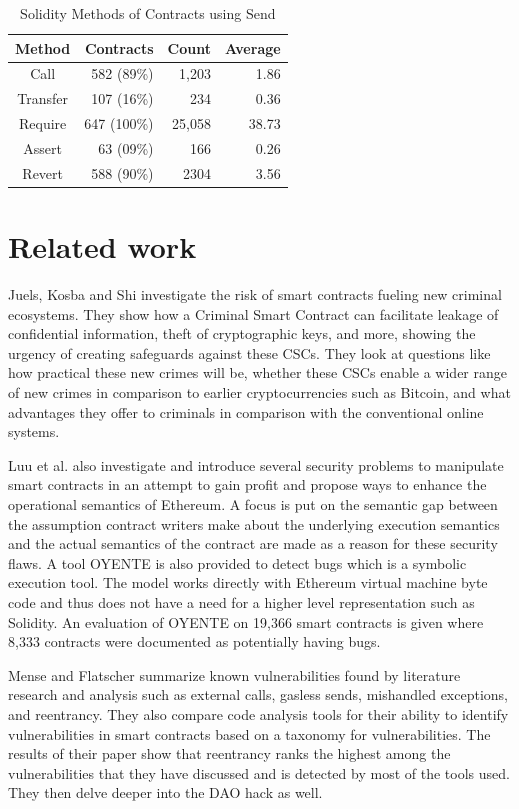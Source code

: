 \documentclass[10pt,conference]{IEEEtran}
\begin{document}
\begin{table}
\center
  \caption{Solidity Methods of Contracts using Send}
  \label{tab:send}
  \begin{tabular}{crrr}
    \hline
    Method & Contracts & Count & Average \\
    \hline
    Call& 582 (89\%) & 1,203 & 1.86\\
    Transfer& 107 (16\%) & 234 & 0.36\\
    Require& 647 (100\%) & 25,058 & 38.73\\
    Assert& 63 (09\%) & 166 & 0.26\\
    Revert& 588 (90\%) & 2304 & 3.56\\
    \hline
\end{tabular}
\end{table}


\section{Related work}


Juels, Kosba and Shi\cite{criminal} investigate the risk of smart contracts fueling new criminal ecosystems. They show how a Criminal Smart Contract can facilitate leakage of confidential information, theft of cryptographic keys, and more, showing the urgency of creating safeguards against these CSCs. They look at questions like how practical these new crimes will be, whether these CSCs enable a wider range of new crimes in comparison to earlier cryptocurrencies such as Bitcoin, and what advantages they offer to criminals in comparison with the conventional online systems.


Luu et al.  \cite{smarter} also investigate and introduce several security problems to manipulate smart contracts in an attempt to gain profit and propose ways to enhance the operational semantics of Ethereum. A focus is put on the semantic gap between the assumption contract writers make about the underlying execution semantics and the actual semantics of the contract are made as a reason for these security flaws. A tool OYENTE is also provided to detect bugs which is a symbolic execution tool. The model works directly with Ethereum virtual machine byte code and thus does not have a need for a higher level representation such as Solidity. An evaluation of OYENTE on 19,366 smart contracts is given where 8,333 contracts were documented as potentially having bugs.

Mense and Flatscher \cite{security} summarize known vulnerabilities found by literature research and analysis such as external calls, gasless sends, mishandled exceptions, and reentrancy. They also compare code analysis tools for their ability to identify vulnerabilities in smart contracts based on a taxonomy for vulnerabilities. The results of their paper show that reentrancy ranks the highest among the vulnerabilities that they have discussed and is detected by most of the tools used. They then delve deeper into the DAO hack as well.
\end{document}
